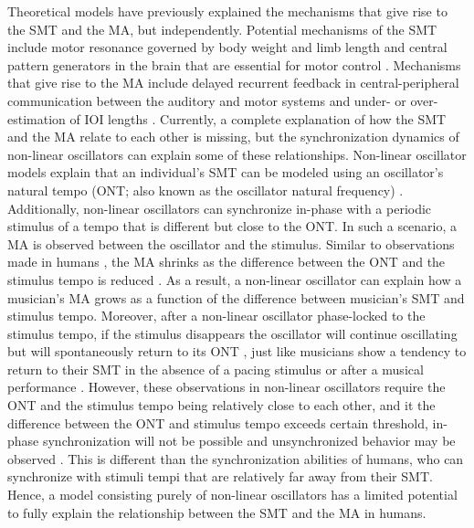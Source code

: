 \documentclass{report}
\begin{document}
Theoretical models have previously explained the mechanisms that give rise to the SMT and the MA, but independently. Potential mechanisms of the SMT include motor resonance governed by body weight and limb length \cite{goodman2000advantages} and central pattern generators in the brain that are essential for motor control \cite{latash1992virtual, wolpert2007probabilistic}. Mechanisms that give rise to the MA include delayed recurrent feedback in central-peripheral communication between the auditory and motor systems \cite{stepp2010strong, roman2019delayed, aschersleben2002temporal} and under- or over-estimation of IOI lengths \cite{loehr2009subdividing}. Currently, a complete explanation of how the SMT and the MA relate to each other is missing, but the synchronization dynamics of non-linear oscillators can explain some of these relationships. Non-linear oscillator models explain that an individual’s SMT can be modeled using an oscillator’s natural tempo (ONT; also known as the oscillator natural frequency) \cite{large2002tracking, large2002perceiving, mcauley2006time}. Additionally, non-linear oscillators can synchronize in-phase with a periodic stimulus of a tempo that is different but close to the ONT. In such a scenario, a MA is observed between the oscillator and the stimulus. Similar to observations made in humans \cite{scheurich2018tapping}, the MA shrinks as the difference between the ONT and the stimulus tempo is reduced \cite{kim2015signal, kim2019mode}. As a result, a non-linear oscillator can explain how a musician’s MA grows as a function of the difference between musician's SMT and stimulus tempo. Moreover, after a non-linear oscillator phase-locked to the stimulus tempo, if the stimulus disappears the oscillator will continue oscillating but will spontaneously return to its ONT \cite{kim2015signal, kim2019mode}, just like musicians show a tendency to return to their SMT in the absence of a pacing stimulus \cite{zamm2018musicians} or after a musical performance \cite{zamm2016endogenous}. However, these observations in non-linear oscillators require the ONT and the stimulus tempo being relatively close to each other, and it the difference between the ONT and stimulus tempo exceeds certain threshold, in-phase synchronization will not be possible and unsynchronized behavior may be observed \cite{kim2015signal, kim2019mode}. This is different than the synchronization abilities of humans, who can synchronize with stimuli tempi that are relatively far away from their SMT. Hence, a model consisting purely of non-linear oscillators has a limited potential to fully explain the relationship between the SMT and the MA in humans.
\end{document}
